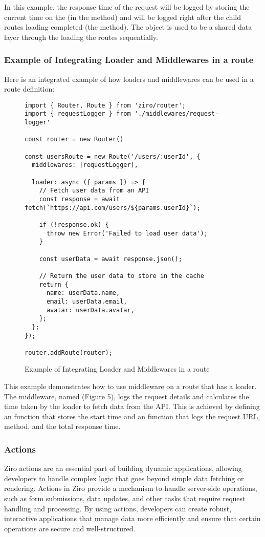 In this example, the response time of the request will be logged by storing the current time on the  (in the  method) and will be logged right after the child routes loading completed (the  method). The  object is used to be a shared data layer through the loading the routes sequentially.

\pagebreak
\subsubsection*{Example of Integrating Loader and Middlewares in a route}
Here is an integrated example of how loaders and middlewares can be used in a route definition:

\begin{figure}[h!]
\begin{verbatim}
import { Router, Route } from 'ziro/router';
import { requestLogger } from './middlewares/request-logger'

const router = new Router()

const usersRoute = new Route('/users/:userId', {
  middlewares: [requestLogger],

  loader: async ({ params }) => {
    // Fetch user data from an API
    const response = await fetch(`https://api.com/users/${params.userId}`);

    if (!response.ok) {
      throw new Error('Failed to load user data');
    }

    const userData = await response.json();

    // Return the user data to store in the cache
    return {
      name: userData.name,
      email: userData.email,
      avatar: userData.avatar,
    };
  };
});

router.addRoute(router);
\end{verbatim}
\caption{Example of Integrating Loader and Middlewares in a route}
\end{figure}

This example demonstrates how to use middleware on a route that has a loader. The middleware, named  (Figure 5), logs the request details and calculates the time taken by the loader to fetch data from the API. This is achieved by defining an  function that stores the start time and an  function that logs the request URL, method, and the total response time.


\subsubsection{Actions}
Ziro actions are an essential part of building dynamic applications, allowing developers to handle complex logic that goes beyond simple data fetching or rendering. Actions in Ziro provide a mechanism to handle server-side operations, such as form submissions, data updates, and other tasks that require request handling and processing. By using actions, developers can create robust, interactive applications that manage data more efficiently and ensure that certain operations are secure and well-structured.

